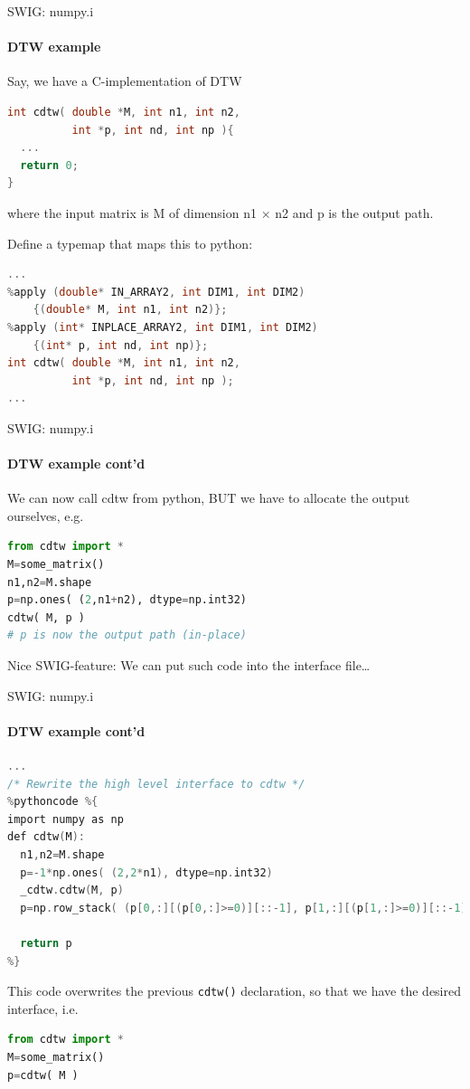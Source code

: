 \documentclass[german]{beamer}
\begin{document}
\begin{frame}[fragile]{SWIG: numpy.i}
\framesubtitle{DTW example}
Say, we have a C-implementation of DTW
\begin{lstlisting}[language=c,caption=cdtw.c]
int cdtw( double *M, int n1, int n2, 
          int *p, int nd, int np ){
  ...
  return 0;
}
\end{lstlisting}
where the input matrix is M of dimension n1 $\times$ n2 and p is the
output path.

Define a typemap that maps this to python:
\begin{lstlisting}[language=c,basicstyle=\tiny,caption=cdtw.i]
...
%apply (double* IN_ARRAY2, int DIM1, int DIM2) 
    {(double* M, int n1, int n2)};
%apply (int* INPLACE_ARRAY2, int DIM1, int DIM2) 
    {(int* p, int nd, int np)};
int cdtw( double *M, int n1, int n2, 
          int *p, int nd, int np );
...
\end{lstlisting}
\end{frame}
\begin{frame}[fragile]{SWIG: numpy.i}
\framesubtitle{DTW example cont'd}
We can now call cdtw from python, BUT we have to allocate the output
ourselves, e.g.
\begin{lstlisting}[language=Python]
from cdtw import *
M=some_matrix()
n1,n2=M.shape
p=np.ones( (2,n1+n2), dtype=np.int32)
cdtw( M, p )
# p is now the output path (in-place)
\end{lstlisting}

Nice SWIG-feature: We can put such code into the interface file\ldots
\end{frame}
\begin{frame}[fragile]{SWIG: numpy.i}
\framesubtitle{DTW example cont'd}
\begin{lstlisting}[language=c,caption=cdtw.i cont'd,basicstyle=\tiny]
...
/* Rewrite the high level interface to cdtw */
%pythoncode %{
import numpy as np
def cdtw(M):
  n1,n2=M.shape
  p=-1*np.ones( (2,2*n1), dtype=np.int32)
  _cdtw.cdtw(M, p)
  p=np.row_stack( (p[0,:][(p[0,:]>=0)][::-1], p[1,:][(p[1,:]>=0)][::-1]))
					
  return p
%}
\end{lstlisting}
This code overwrites the previous {\tt cdtw()} declaration, so that we
have the desired interface, i.e.
\begin{lstlisting}[language=python]
from cdtw import *
M=some_matrix()
p=cdtw( M )
\end{lstlisting}
\end{frame}
\end{document}
